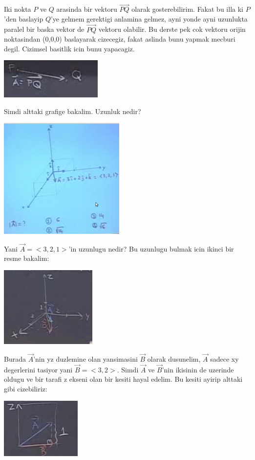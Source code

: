 \documentclass[12pt,fleqn]{article}\usepackage{../common}
\begin{document}
Iki nokta $P$ ve $Q$ arasinda bir vektoru $\vec{PQ}$ olarak
gosterebilirim. Fakat bu illa ki $P$'den baslayip $Q$'ye gelmem gerektigi
anlamina gelmez, ayni yonde ayni uzunlukta paralel bir baska vektor de
$\vec{PQ}$ vektoru olabilir. Bu derste pek cok vektoru orijin noktasindan (0,0,0)
baslayarak cizecegiz, fakat aslinda bunu yapmak mecburi degil. Cizimsel
basitlik icin bunu yapacagiz. 

\includegraphics[height=2cm]{1_2.png}

Simdi alttaki grafige bakalim. Uzunluk nedir?

\includegraphics[height=6cm]{1_3.png}

Yani $\vec{A} = <3,2,1>$'in uzunlugu nedir?  Bu uzunlugu bulmak icin ikinci bir
resme bakalim:

\includegraphics[height=4cm]{1_4.png}

Burada $\vec{A}$'nin yz duzlemine olan yansimasini $\vec{B}$ olarak
dusunelim, $\vec{A}$ sadece xy degerlerini tasiyor yani $\vec{B} = <3,2>$.
Simdi $\vec{A}$ ve $\vec{B}$'nin ikisinin de uzerinde oldugu ve bir tarafi
z ekseni olan bir kesiti hayal edelim. Bu kesiti ayirip alttaki gibi
cizebiliriz:

\includegraphics[height=3cm]{1_5.png}
\end{document}
